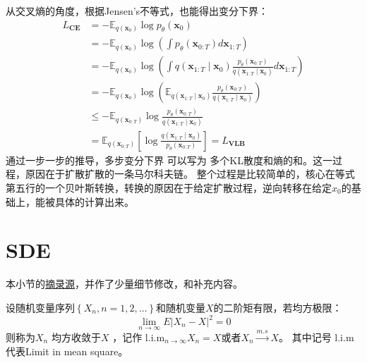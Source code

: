 从交叉熵的角度，根据Jensen's不等式，也能得出变分下界：
\begin{equation}
  \begin{aligned} L_{\mathbf{CE}} 
    & =-\mathbb{E}_{q\left(\mathbf{x}_0\right)} \log p_\theta\left(\mathbf{x}_0\right) \\ 
    & =-\mathbb{E}_{q\left(\mathbf{x}_0\right)} \log \left(\int p_\theta\left(\mathbf{x}_{0: T}\right) d \mathbf{x}_{1: T}\right) \\ 
    & =-\mathbb{E}_{q\left(\mathbf{x}_0\right)} \log \left(\int q\left(\mathbf{x}_{1: T} \mid \mathbf{x}_0\right) \frac{p_\theta\left(\mathbf{x}_{0: T}\right)}{q\left(\mathbf{x}_{1: T} \mid \mathbf{x}_0\right)} d \mathbf{x}_{1: T}\right) \\ 
    & =-\mathbb{E}_{q\left(\mathbf{x}_0\right)} \log \left(\mathbb{E}_{q\left(\mathbf{x}_{1: T} \mid \mathbf{x}_0\right)} \frac{p_\theta\left(\mathbf{x}_{0: T}\right)}{q\left(\mathbf{x}_{1: T} \mid \mathbf{x}_0\right)}\right) \\ 
    & \leq-\mathbb{E}_{q\left(\mathbf{x}_{0: T}\right)} \log \frac{p_\theta\left(\mathbf{x}_{0: T}\right)}{q\left(\mathbf{x}_{1: T} \mid \mathbf{x}_0\right)} \\ 
    & =\mathbb{E}_{q\left(\mathbf{x}_{0: T}\right)}\left[\log \frac{q\left(\mathbf{x}_{1: T} \mid \mathbf{x}_0\right)}{p_\theta\left(\mathbf{x}_{0: T}\right)}\right]=L_{\mathbf{VLB}}
  \end{aligned}
\end{equation}
通过一步一步的推导，多步变分下界 可以写为 多个KL散度和熵的和。这一过程，原因在于扩散扩散的一条马尔科夫链。
整个过程是比较简单的，核心在等式第五行的一个贝叶斯转换，转换的原因在于给定扩散过程，逆向转移在给定$x_0$的基础上，能被具体的计算出来。









\section{SDE}
本小节的\href{https://zhuanlan.zhihu.com/p/619188621}{摘录源}，并作了少量细节修改，和补充内容。

\begin{definition}
  设随机变量序列$\left\{X_n, n=1,2, \ldots\right\}$和随机变量$ X$的二阶矩有限，若均方极限：
  \begin{equation}
    \lim _{n \rightarrow \infty} E\left|X_n-X\right|^2=0
  \end{equation}
 则称为$X_n$ 均方收敛于$X$ ，记作  $\mathrm{l.i.m}_{n \rightarrow \infty} X_n=X$或者$X_n \xrightarrow{m . s} X$。
 其中记号 l.i.m代表Limit in mean square。
\end{definition}

